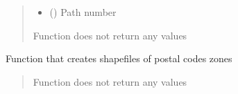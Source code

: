 \documentclass[letterpaper,10pt,english]{sphinxmanual}
\begin{document}
\begin{fulllineitems}
\begin{quote}
\begin{description}
\begin{itemize}
\item {} 
\sphinxAtStartPar
{} () \textendash{} Path number

\end{itemize}

\sphinxAtStartPar
{}

\sphinxAtStartPar
Function does not return any values

\end{description}\end{quote}

\end{fulllineitems}


\begin{fulllineitems}
\label{\detokenize{pcm_utilities:pcm_utilities.create_postal_codes_shps}}
\pysigstartsignatures
{}
\pysigstopsignatures
\sphinxAtStartPar
Function that creates shapefiles of postal codes zones
\begin{quote}\begin{description}
\sphinxAtStartPar
{}

\sphinxAtStartPar
Function does not return any values

\end{description}\end{quote}

\end{fulllineitems}

\end{document}
